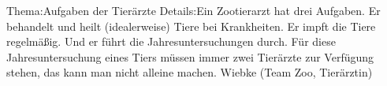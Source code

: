 
%
	{Thema:}{Aufgaben der Tierärzte}%
	{Details:}{Ein Zootierarzt hat drei Aufgaben. Er behandelt und heilt (idealer\-weise) Tiere bei Krankheiten. Er impft die Tiere regelmäßig. Und er führt die Jahresuntersuchungen durch. Für diese Jahres\-untersuchung eines Tiers müssen immer zwei Tierärzte zur Verfügung stehen, das kann man nicht alleine machen.}%
	{Wiebke (Team Zoo, Tierärztin)}
